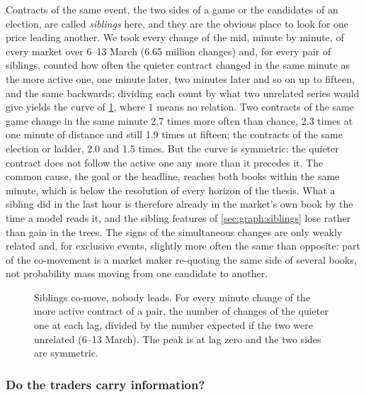 Contracts of the same event, the two sides of a game or the candidates of an election,
are called \emph{siblings} here, and they are the obvious place to look for one price
leading another.  We took every change of the mid, minute by minute, of every market over
6--13 March (6.65 million changes) and, for every pair of siblings, counted how often the
quieter contract changed in the same minute as the more active one, one minute later, two
minutes later and so on up to fifteen, and the same backwards; dividing each count by what
two unrelated series would give yields the curve of \cref{fig:expl:leadlag}, where $1$
means no relation.  Two contracts of the same game change in the same minute 2.7 times
more often than chance, 2.3 times at one minute of distance and still 1.9 times at
fifteen; the contracts of the same election or ladder, 2.0 and 1.5 times.  But the curve
is symmetric: the quieter contract does not follow the active one any more than it
precedes it.  The common cause, the goal or the headline, reaches both books within the
same minute, which is below the resolution of every horizon of the thesis.  What a sibling
did in the last hour is therefore already in the market's own book by the time a model
reads it, and the sibling features of \cref{sec:graph:siblings} lose rather than gain in
the trees.  The signs of the simultaneous changes are only weakly related and, for
exclusive events, slightly more often the same than opposite: part of the co-movement is a
market maker re-quoting the same side of several books, not probability mass moving from
one candidate to another.

\begin{figure}[t]
\centering

\caption{Siblings co-move, nobody leads.  For every minute change of the more active
contract of a pair, the number of changes of the quieter one at each lag, divided by the
number expected if the two were unrelated (6--13 March).  The peak is at lag zero and the
two sides are symmetric.}
\label{fig:expl:leadlag}
\end{figure}

\subsubsection{Do the traders carry information?}
\label{sec:expl:wallets}

